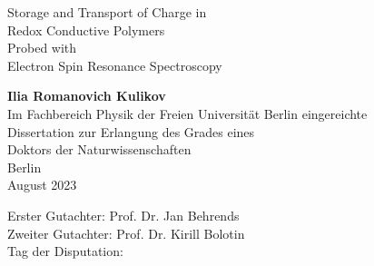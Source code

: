 \documentclass{book}
\begin{document}
\thispagestyle{empty}
\begin{center}
\begin{huge}
Storage and Transport of Charge in\\
Redox Conductive Polymers\\
Probed with\\
Electron Spin Resonance Spectroscopy\\
\end{huge}
\vspace{10\baselineskip}
\textbf{Ilia Romanovich Kulikov}\\
\vspace{10\baselineskip}
Im Fachbereich Physik der Freien Universit\"{a}t Berlin eingereichte\\
Dissertation zur Erlangung des Grades eines\\
Doktors der Naturwissenschaften\\
\vspace{16\baselineskip}
Berlin\\
August 2023\\




\end{center}
\newpage
\vspace{36\baselineskip}

\hspace*{\fill} Erster Gutachter: Prof. Dr. Jan Behrends\\
\hspace*{\fill} Zweiter Gutachter: Prof. Dr. Kirill Bolotin\\
\hspace*{\fill} Tag der Disputation: \\

\newpage
\tableofcontents
\newpage











\end{document}
